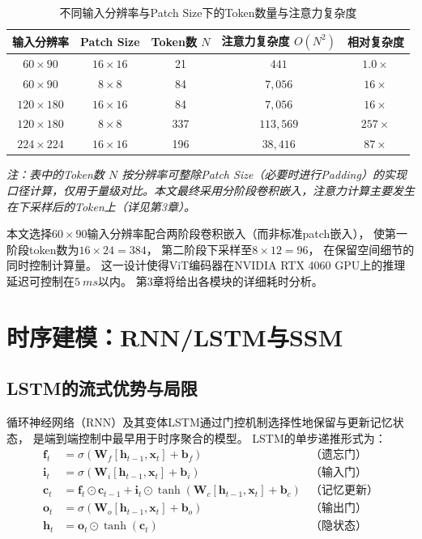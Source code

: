 \begin{table}[htbp]
\centering
\caption{不同输入分辨率与Patch Size下的Token数量与注意力复杂度}
\label{tab:vit_complexity}
\begin{tabular}{ccccc}
\toprule
\textbf{输入分辨率} & \textbf{Patch Size} & \textbf{Token数} $N$ & \textbf{注意力复杂度} $O(N^2)$ & \textbf{相对复杂度} \\
\midrule
$60 \times 90$ & $16 \times 16$ & 21 & $441$ & $1.0\times$ \\
$60 \times 90$ & $8 \times 8$ & 84 & $7{,}056$ & $16\times$ \\
$120 \times 180$ & $16 \times 16$ & 84 & $7{,}056$ & $16\times$ \\
$120 \times 180$ & $8 \times 8$ & 337 & $113{,}569$ & $257\times$ \\
$224 \times 224$ & $16 \times 16$ & 196 & $38{,}416$ & $87\times$ \\
\bottomrule
\end{tabular}
\vspace{1ex}
\par\raggedright\footnotesize\textit{注：表中的Token数 $N$ 按分辨率可整除Patch Size（必要时进行Padding）的实现口径计算，仅用于量级对比。本文最终采用分阶段卷积嵌入，注意力计算主要发生在下采样后的Token上（详见第3章）。}
\end{table}

本文选择$60 \times 90$输入分辨率配合两阶段卷积嵌入（而非标准patch嵌入），
使第一阶段token数为$16 \times 24 = 384$，
第二阶段下采样至$8 \times 12 = 96$，
在保留空间细节的同时控制计算量。
这一设计使得ViT编码器在NVIDIA RTX 4060 GPU上的推理延迟可控制在$\SI{5}{ms}$以内。
第3章将给出各模块的详细耗时分析。


\section{时序建模：RNN/LSTM与SSM}

\subsection{LSTM的流式优势与局限}

循环神经网络（RNN）\cite{Elman1990RNN}及其变体LSTM\cite{Hochreiter1997LSTM}通过门控机制选择性地保留与更新记忆状态，
是端到端控制中最早用于时序聚合的模型。
LSTM的单步递推形式为：
\begin{align}
  \mathbf{f}_t &= \sigma(\mathbf{W}_f [\mathbf{h}_{t-1}, \mathbf{x}_t] + \mathbf{b}_f) &\text{（遗忘门）} \\
  \mathbf{i}_t &= \sigma(\mathbf{W}_i [\mathbf{h}_{t-1}, \mathbf{x}_t] + \mathbf{b}_i) &\text{（输入门）} \\
  \mathbf{c}_t &= \mathbf{f}_t \odot \mathbf{c}_{t-1} + \mathbf{i}_t \odot \tanh(\mathbf{W}_c [\mathbf{h}_{t-1}, \mathbf{x}_t] + \mathbf{b}_c) &\text{（记忆更新）} \\
  \mathbf{o}_t &= \sigma(\mathbf{W}_o [\mathbf{h}_{t-1}, \mathbf{x}_t] + \mathbf{b}_o) &\text{（输出门）} \\
  \mathbf{h}_t &= \mathbf{o}_t \odot \tanh(\mathbf{c}_t) &\text{（隐状态）}
\end{align}

